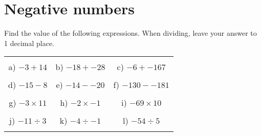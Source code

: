 \documentclass[12pt]{article}
\begin{document}
\pagestyle{fancy}
\fancyfoot{} 
\section{Negative numbers}
Find the value of the following expressions. When dividing, leave your answer to 1 decimal place.
\begin{table}[h!]
\centering
\begin{tabular}{c c c}
\hspace{5cm} & \hspace{5cm} & \hspace{5cm} \\
a) ${-3} + {14}$ & b) ${-18} + {-28}$ & c) ${-6} + {-167}$ \\ \\
d) ${-15} - {8}$ & e) ${-14} - {-20}$ & f) ${-130} - {-181}$ \\ \\
g) ${-3}\times{11}$ & h) ${-2}\times{-1}$ & i) ${-69}\times{10}$ \\ \\
j) ${-11}\div{3}$ & k) ${-4}\div{-1}$ & l) ${-54}\div{5}$ \\ \\
\end{tabular}
\end{table}
\newline
\end{document}
